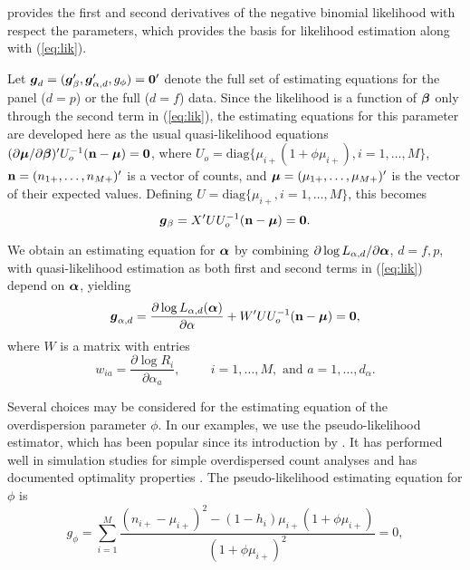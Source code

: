 \documentclass[12pt]{article}
\def \alph{\mbox{\boldmath $\alpha$ \unboldmath}\!\!}
\def \bet{\mbox{\boldmath $\beta$ \unboldmath}\!\!}
\def \muv{\mbox{\boldmath $\mu$ \unboldmath}\!\!}
\def \g{\mbox{\boldmath $g$ \unboldmath}\!\!}
\begin{document}
\cite{lawless1987negative} provides the first and second derivatives of the negative binomial likelihood with respect the parameters, which provides the basis for likelihood estimation along with (\ref{eq:lik}). 


Let  ${\g}_d=(\g'_{\beta},\g'_{\alpha,d},g_{\phi})={\bf 0}'$ denote the full set of estimating equations for the panel ($d=p$) or the
full ($d=f$) data. Since the likelihood is a function of $\bet$ only through the second term in (\ref{eq:lik}), the estimating equations for this parameter are developed here as the usual quasi-likelihood equations $(\partial \muv / \partial \bet )' U^{-1}_o (\bf n- \muv)=0$, where $U_o=\mbox{diag}\{\mu_{i+}
(1+\phi \mu_{i+}),i=1,\ldots,M\}$, ${\bf
  n}=(n_{1+},\ldots,n_{M+})'$ is a vector of counts, and $
\muv=(\mu_{1+},\ldots,\mu_{M+})'$ is the vector of their expected values. Defining $U=\mbox{diag}\{\mu_{i+},i=1,\ldots,M\}$, this becomes 
\begin{equation}
\g_{\beta}=X'U U_{o}^{-1}({\bf n}-\muv)={\bf 0}.
\label{eq:gen-est-eqs}
\end{equation}
 

We obtain an estimating equation for $\alph$ by combining 
 $\partial\log L_{\alpha,d}/\partial\alph$, $d=f, p$, with
quasi-likelihood estimation as both first and second terms in (\ref{eq:lik}) depend on $\alph$, yielding
\begin{equation}
 {\g}_{\alpha,d}=\frac{\partial \log L_{\alpha,d}(\alph)}{\partial \alpha}+
W'U U_{o}^{-1}({\bf n}-\muv)={\bf 0},
\label{eq:ga-f}
\end{equation}
\noindent where $W$ is a matrix with entries
\begin{equation}
w_{ia}=\frac{\partial\log R_{i}}{\partial\alpha_{a}},\hspace{1cm}
i=1,\ldots,M,\mbox{ and } a=1,\ldots,d_{\alpha}.
\label{eq:wi}
\end{equation}

Several choices may be considered for the estimating equation of the
overdispersion parameter $\phi$. In our examples, we use the
pseudo-likelihood
estimator, which has been popular since its introduction by \citet{davidian1987variance}. It has performed well in simulation studies for simple overdispersed count analyses and has
documented optimality properties \citep{nelder1992likelihood}. The pseudo-likelihood estimating equation for $\phi$ is
\begin{equation}
g_{\phi} = \sum_{i=1}^{M}
    \frac{(n_{i+}-\mu_{i+})^{2}-(1-h_{i})\mu_{i+}(1+\phi \mu_{i+})}
    {(1+\phi\mu_{i+})^{2}} = 0,
\label{eq:gt}
    \end{equation}
\end{document}
